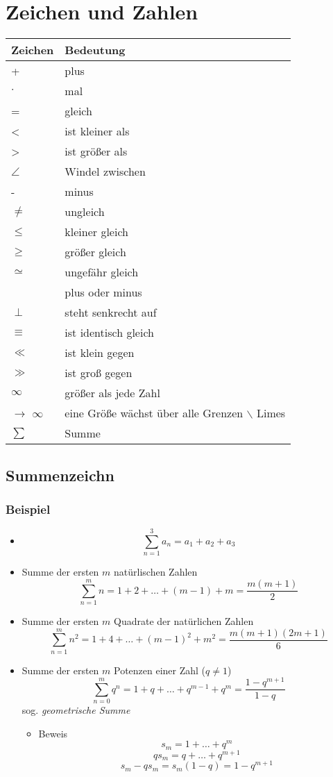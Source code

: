 \documentclass[11pt]{article}
\begin{document}
\section{Zeichen und Zahlen}
\label{sec-2}
\begin{center}
\begin{tabular}{ll}
Zeichen & Bedeutung\\
\hline
+ & plus\\
$\cdot$ & mal\\
= & gleich\\
< & ist kleiner als\\
> & ist größer als\\
$\angle$ & Windel zwischen\\
- & minus\\
$\neq$ & ungleich\\
$\le$ & kleiner gleich\\
$\ge$ & größer gleich\\
$\simeq$ & ungefähr gleich\\
\textpm{} & plus oder minus\\
$\perp$ & steht senkrecht auf\\
$\equiv$ & ist identisch gleich\\
$\ll$ & ist klein gegen\\
$\gg$ & ist groß gegen\\
$\infty$ & größer als jede Zahl\\
$\to$ $\infty$ & eine Größe wächst über alle Grenzen $\backslash$ Limes\\
$\sum$ & Summe\\
\end{tabular}
\end{center}

\subsection{Summenzeichn}
\label{sec-2-1}
\subsubsection{Beispiel}
\label{sec-2-1-1}
\begin{itemize}
\item $$\sum_{n=1}^3a_n=a_1 + a_2 + a_3$$
\item Summe der ersten $m$ natürlischen Zahlen
$$\sum_{n=1}^{m}n = 1 + 2 + \ldots + (m -1) + m = \frac{m (m + 1)}{2}$$
\item Summe der ersten $m$ Quadrate der natürlichen Zahlen
$$\sum_{n=1}^m n^2 = 1 + 4 + \ldots + (m-1)^2 + m^2 = \frac{m(m+1)(2m+1)}{6}$$
\item Summe der ersten $m$ Potenzen einer Zahl ($q \neq 1$)
$$\sum_{n=0}^m q^n = 1+q+\dots+q^{m-1}+q^m = \frac{1 - q^{m + 1}}{1-q}$$
sog. \emph{geometrische Summe}
\begin{itemize}
\item Beweis
$$s_m = 1 + \ldots + q^m$$
$$q s_m = q + \ldots + q^{m+1}$$
$$s_m - q s_m = s_m(1-q) = 1-q^{m+1}$$
\end{itemize}
\end{itemize}
\end{document}
